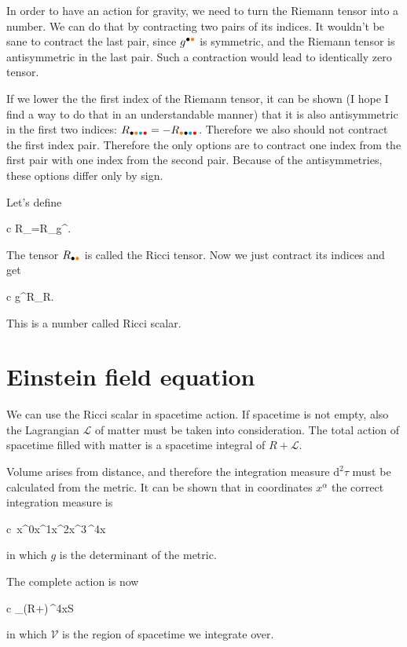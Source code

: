 \documentclass[11pt,oneside%
]{memoir}
\newenvironment{eqna}{\begin{IEEEeqnarray*}{c}}{\end{IEEEeqnarray*}\ignorespacesafterend}
\newcommand{\dd}{\mathrm{d}}
\newcommand{\coa}{{\color{black}\bullet}}
\newcommand{\cob}{{\color{oranssi}\bullet}}
\newcommand{\coc}{{\color{cyan}\bullet}}
\newcommand{\cod}{{\color{red}\bullet}}
\begin{document}
In order to have an action for gravity, we need to turn the Riemann tensor into a number. We can do that by contracting two pairs of its indices. It wouldn't be sane to contract the last pair, since \(g^{\coa\cob}\) is symmetric, and the Riemann tensor is antisymmetric in the last pair. Such a contraction would lead to identically zero tensor.

If we lower the the first index of the Riemann tensor, it can be shown (I hope I find a way to do that in an understandable manner) that it is also antisymmetric in the first two indices: \(R_{\coa\cob\coc\cod}=-R_{\cob\coa\coc\cod}\). Therefore we also should not contract the first index pair. Therefore the only options are to contract one index from the first pair with one index from the second pair. Because of the antisymmetries, these options differ only by sign.

Let's define
\begin{eqna}
R_{\coa\cob}=R_{\coa\coc\cod\cob}g^{\coc\cod}.
\end{eqna}
The tensor \(R_{\coa\cob}\) is called the Ricci tensor. Now we just contract its indices and get
\begin{eqna}
g^{\coa\cob}R_{\coa\cob}\doteq R.
\end{eqna}
This is a number called Ricci scalar.

\section{Einstein field equation}

We can use the Ricci scalar in spacetime action. If spacetime is not empty, also the Lagrangian \(\mathcal{L}\) of matter must be taken into consideration. The total action of spacetime filled with matter is a spacetime integral of \(R+\mathcal{L}\).

Volume arises from distance, and therefore the integration measure \(\dd^2\tau\) must be calculated from the metric. It can be shown that in coordinates \(x^\alpha\) the correct integration measure is
\begin{eqna}
\,\dd x^0\dd x^1\dd x^2\dd x^3\doteq{}\,\dd^4x
\end{eqna}
in which \(g\) is the determinant of the metric.

The complete action is now
\begin{eqna}
\int_(R+)\,\dd^4x\doteq S
\end{eqna}
in which \(\mathcal{V}\) is the region of spacetime we integrate over.
\end{document}
